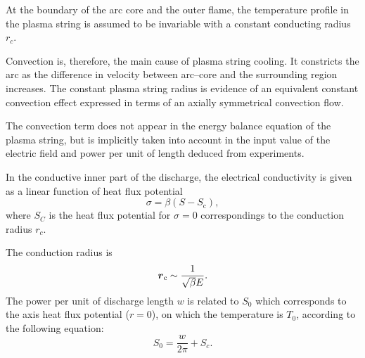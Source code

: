 At the boundary of the arc core and the outer flame, the temperature profile in the plasma string is assumed to be invariable with a constant conducting radius $r_c$.


Convection is, therefore, the main cause of plasma string  cooling. It constricts the arc as the difference in velocity between arc–core and the surrounding region increases. The constant plasma string radius is evidence of an equivalent
constant convection effect expressed in terms of an axially symmetrical convection flow.

The convection term does not appear in the energy balance equation of the plasma string, but is implicitly taken into account in the input value of the electric field and power per unit of length deduced from experiments. 

In the conductive inner part of the discharge, the electrical conductivity is given as a linear function of heat flux potential
\begin{equation}
    \sigma = \beta (S - S_{\text{c}}),
\end{equation}
where $S_C$ is the heat flux potential for $\sigma=0$ correspondings to the conduction radius $r_c$.

 The conduction radius is 
\begin{equation}
    \mbox{\boldmath $r$}_c \sim \frac{1}{\sqrt{\beta} E} .
\end{equation}
The power per unit of discharge length $w$ is related to $S_0$ which corresponds to the axis heat flux potential ($r=0$), on which the temperature is $T_0$, according to the following equation:
\begin{equation*}
    S_0 = \frac{w}{2\pi} + S_c.
\end{equation*}
